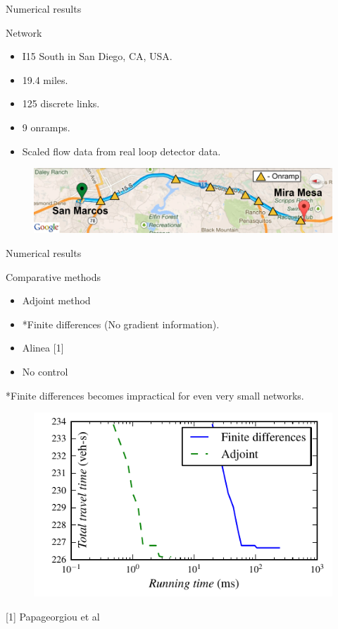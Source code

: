 \begin{frame}{Numerical results}

\begin{block}{Network}
\begin{itemize}
\item I15 South in San Diego, CA, USA.
\item 19.4 miles.
\item 125 discrete links.
\item 9 onramps.
\item Scaled flow data from real loop detector data.
\end{itemize}

\begin{figure}
\begin{centering}
\includegraphics[width=0.6\columnwidth]{../images/map}
\par\end{centering}
\end{figure}

\end{block}

\end{frame}

\begin{frame}{Numerical results}

\begin{block}{Comparative methods}
\begin{itemize}
	\item Adjoint method
	\item *Finite differences (No gradient information).
	\item Alinea [1]
	\item No control
\end{itemize}
*Finite differences becomes impractical for even very small networks.

\begin{figure}
\begin{centering}
\includegraphics[width=0.4\columnwidth]{../images/itergrad}
\par\end{centering}
\end{figure}
\end{block}

[1] Papageorgiou et al

\end{frame}

